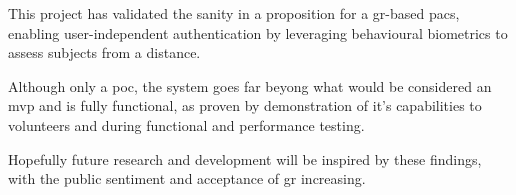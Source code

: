 This project has validated the sanity in a proposition for a \ac{gr}-based \ac{pacs}, enabling user-independent authentication by leveraging behavioural biometrics to assess subjects from a distance.

Although only a \ac{poc}, the system goes far beyong what would be considered an \ac{mvp} and is fully functional, as proven by demonstration of it's capabilities to volunteers and during functional and performance testing.

Hopefully future research and development will be inspired by these findings, with the public sentiment and acceptance of \ac{gr} increasing.